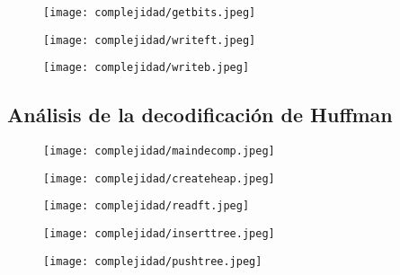 \documentclass[12 pt]{report}
\begin{document}
\newpage
\begin{figure}[h!]
  \texttt{[image: complejidad/getbits.jpeg]}
  \caption{\label{fig:Obtener la codificación correspondiente} }
\end{figure}
\begin{figure}[h!]
  \texttt{[image: complejidad/writeft.jpeg]}
  \caption{\label{fig:Escribir la tabla de frecuencias} }
\end{figure}
\newpage
\begin{figure}[h!]
  \texttt{[image: complejidad/writeb.jpeg]}
  \caption{\label{fig:Escribir el archivo compreso} }
\end{figure}
\newpage

\subsection{Análisis de la decodificación de Huffman}
\begin{figure}[h!]
  \centering
  \texttt{[image: complejidad/maindecomp.jpeg]}
  \caption{\label{fig:Main de la decodificación} }
\end{figure}
\newpage
\begin{figure}[h!]
  \centering
  \texttt{[image: complejidad/createheap.jpeg]}
  \caption{\label{fig:Reservar el espacio del montículo} }
\end{figure}
\begin{figure}[h!]
  \centering
  \texttt{[image: complejidad/readft.jpeg]}
  \caption{\label{fig:Leer la tabla de frecuencias}}
\end{figure}
\newpage
\begin{figure}[h!]
  \centering
  \texttt{[image: complejidad/inserttree.jpeg]}
  \caption{\label{fig:Insertar nodos en la cola de prioridad} }
\end{figure}

\begin{figure}[h!]
  \centering
  \texttt{[image: complejidad/pushtree.jpeg]}
  \caption{\label{fig:Insertar datos en los nodos} }
\end{figure}
\end{document}
